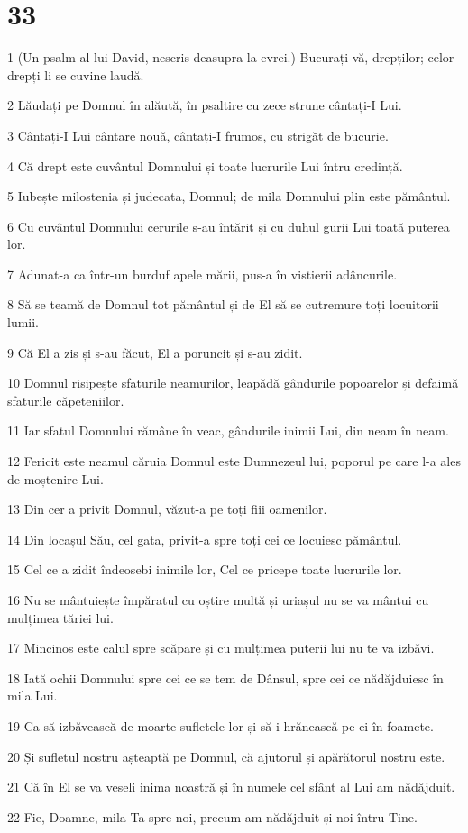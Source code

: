 \chapter{33}

\par 1 (Un psalm al lui David, nescris deasupra la evrei.) Bucurați-vă, drepților; celor drepți li se cuvine laudă.
\par 2 Lăudați pe Domnul în alăută, în psaltire cu zece strune cântați-I Lui.
\par 3 Cântați-I Lui cântare nouă, cântați-I frumos, cu strigăt de bucurie.
\par 4 Că drept este cuvântul Domnului și toate lucrurile Lui întru credință.
\par 5 Iubește milostenia și judecata, Domnul; de mila Domnului plin este pământul.
\par 6 Cu cuvântul Domnului cerurile s-au întărit și cu duhul gurii Lui toată puterea lor.
\par 7 Adunat-a ca într-un burduf apele mării, pus-a în vistierii adâncurile.
\par 8 Să se teamă de Domnul tot pământul și de El să se cutremure toți locuitorii lumii.
\par 9 Că El a zis și s-au făcut, El a poruncit și s-au zidit.
\par 10 Domnul risipește sfaturile neamurilor, leapădă gândurile popoarelor și defaimă sfaturile căpeteniilor.
\par 11 Iar sfatul Domnului rămâne în veac, gândurile inimii Lui, din neam în neam.
\par 12 Fericit este neamul căruia Domnul este Dumnezeul lui, poporul pe care l-a ales de moștenire Lui.
\par 13 Din cer a privit Domnul, văzut-a pe toți fiii oamenilor.
\par 14 Din locașul Său, cel gata, privit-a spre toți cei ce locuiesc pământul.
\par 15 Cel ce a zidit îndeosebi inimile lor, Cel ce pricepe toate lucrurile lor.
\par 16 Nu se mântuiește împăratul cu oștire multă și uriașul nu se va mântui cu mulțimea tăriei lui.
\par 17 Mincinos este calul spre scăpare și cu mulțimea puterii lui nu te va izbăvi.
\par 18 Iată ochii Domnului spre cei ce se tem de Dânsul, spre cei ce nădăjduiesc în mila Lui.
\par 19 Ca să izbăvească de moarte sufletele lor și să-i hrănească pe ei în foamete.
\par 20 Și sufletul nostru așteaptă pe Domnul, că ajutorul și apărătorul nostru este.
\par 21 Că în El se va veseli inima noastră și în numele cel sfânt al Lui am nădăjduit.
\par 22 Fie, Doamne, mila Ta spre noi, precum am nădăjduit și noi întru Tine.

